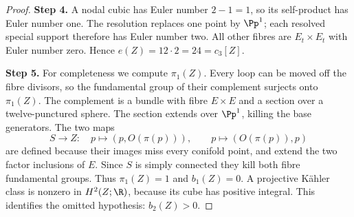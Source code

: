 \begin{proof}
\noindent\textbf{Step 4.} A nodal cubic has Euler number $2-1=1$, so its self-product has
Euler number one. The resolution replaces one point by $\Pp^1$;
each resolved special support therefore has Euler number two.
All other fibres are $E_t\times E_t$ with Euler number zero.
Hence $e(Z)=12\cdot2=24=c_3[Z]$.

\noindent\textbf{Step 5.} For completeness we compute $\pi_1(Z)$. Every loop can be moved
off the fibre divisors, so the fundamental group of their complement
surjects onto $\pi_1(Z)$. The complement is a bundle with fibre
$E\times E$ and a section over a twelve-punctured sphere. The
section extends over $\Pp^1$, killing the base generators. The
two maps
\[
 S\longrightarrow Z:\quad p\mapsto(p,O(\pi(p))),\qquad
 p\mapsto(O(\pi(p)),p)
\]
are defined because their images miss every conifold point, and
extend the two factor inclusions of $E$. Since $S$ is simply
connected they kill both fibre fundamental groups. Thus
$\pi_1(Z)=1$ and $b_1(Z)=0$. A projective Kähler class is nonzero
in $H^2(Z;\R)$, because its cube has positive integral. This
identifies the omitted hypothesis: $b_2(Z)>0$.
\end{proof}

